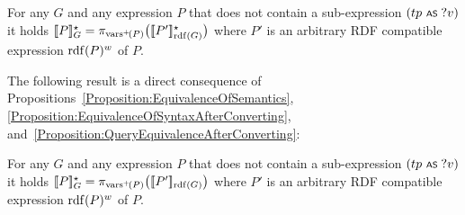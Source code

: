 \begin{proposition} \label{Proposition:QueryEquivalenceAfterConverting}
	For any {\RDFplusGraph} $G$ and any {\SPARQLplus} expression $P$ that does not contain a sub-expression
	$(tp \text{ \normalfont\scriptsize\textsf{AS} } ?v)$ it holds $[\![P]\!]^\star_{G} = \pi_{\mathrm{vars}^+\!(P)}\bigl( [\![P']\!]^\star_{\mathrm{rdf}(G)} \bigr)$ where $P'$ is an arbitrary RDF compatible expression $\mathrm{rdf}(P)^w$ of $P$.
\end{proposition}

\noindent
The following result is a direct consequence of Propositions~\ref{Proposition:EquivalenceOfSemantics}, \ref{Proposition:EquivalenceOfSyntaxAfterConverting}, and~\ref{Proposition:QueryEquivalenceAfterConverting}:
\begin{corollary}
	For any {\RDFplusGraph} $G$ and any {\SPARQLplus} expression $P$ that does not contain a sub-expression
	$(tp \text{ \normalfont\scriptsize\textsf{AS} } ?v)$ it holds $[\![P]\!]^\star_{G} = \pi_{\mathrm{vars}^+\!(P)}\bigl( [\![P']\!]_{\mathrm{rdf}(G)} \bigr)$ where $P'$ is an arbitrary RDF compatible expression $\mathrm{rdf}(P)^w$ of $P$.
\end{corollary}

\noindent
{}